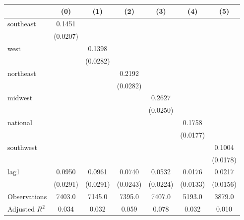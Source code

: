 \begin{tabular}{lcccccc}
\toprule
 & (0) & (1) & (2) & (3) & (4) & (5) \\
\midrule
southeast & 0.1451 &  &  &  &  &  \\
\vspace{0.2cm}
 & (0.0207) &  &  &  &  &  \\
west &  & 0.1398 &  &  &  &  \\
\vspace{0.2cm}
 &  & (0.0282) &  &  &  &  \\
northeast &  &  & 0.2192 &  &  &  \\
\vspace{0.2cm}
 &  &  & (0.0282) &  &  &  \\
midwest &  &  &  & 0.2627 &  &  \\
\vspace{0.2cm}
 &  &  &  & (0.0250) &  &  \\
national &  &  &  &  & 0.1758 &  \\
\vspace{0.2cm}
 &  &  &  &  & (0.0177) &  \\
southwest &  &  &  &  &  & 0.1004 \\
\vspace{0.2cm}
 &  &  &  &  &  & (0.0178) \\
lag1 & 0.0950 & 0.0961 & 0.0740 & 0.0532 & 0.0176 & 0.0217 \\
\vspace{0.2cm}
 & (0.0291) & (0.0291) & (0.0243) & (0.0224) & (0.0133) & (0.0156) \\
\midrule
Observations & 7403.0 & 7145.0 & 7395.0 & 7407.0 & 5193.0 & 3879.0 \\
Adjusted $R^2$ & 0.034 & 0.032 & 0.059 & 0.078 & 0.032 & 0.010 \\
\bottomrule
\end{tabular}